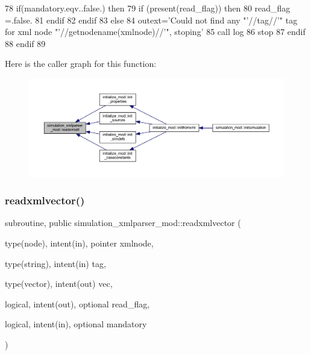 \begin{DoxyCode}
78             \textcolor{keywordflow}{if}(mandatory.eqv..false.) \textcolor{keywordflow}{then}
79               \textcolor{keywordflow}{if} (\textcolor{keyword}{present}(read\_flag)) \textcolor{keywordflow}{then}
80                 read\_flag =.false.
81 \textcolor{keywordflow}{              endif}
82 \textcolor{keywordflow}{            endif}
83         \textcolor{keywordflow}{else}
84             outext=\textcolor{stringliteral}{'Could not find any "'}//tag//\textcolor{stringliteral}{'" tag for xml node "'}//getnodename(xmlnode)//\textcolor{stringliteral}{'", stoping'}
85             \textcolor{keyword}{call }log%
86             stop
87 \textcolor{keywordflow}{        endif}
88 \textcolor{keywordflow}{    endif}
89 
\end{DoxyCode}
Here is the caller graph for this function\+:\nopagebreak
\begin{figure}[H]
\begin{center}
\leavevmode
\includegraphics[width=350pt]{namespacesimulation__xmlparser__mod_ab062c8e064b043446d4f6ac695b306ab_icgraph}
\end{center}
\end{figure}
\mbox{\label{namespacesimulation__xmlparser__mod_a48bcd153bef2149410d66842b564728d}} 
\subsubsection{\texorpdfstring{readxmlvector()}{readxmlvector()}}
{\footnotesize\ttfamily subroutine, public simulation\+\_\+xmlparser\+\_\+mod\+::readxmlvector (\begin{DoxyParamCaption}\item[{type(node), intent(in), pointer}]{xmlnode,  }\item[{type(string), intent(in)}]{tag,  }\item[{type(vector), intent(out)}]{vec,  }\item[{logical, intent(out), optional}]{read\+\_\+flag,  }\item[{logical, intent(in), optional}]{mandatory }\end{DoxyParamCaption})}



